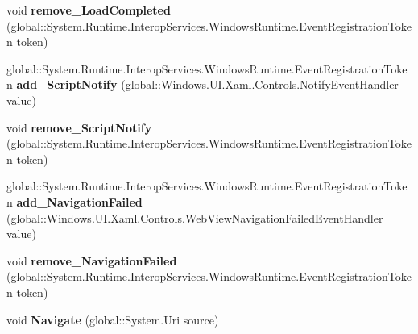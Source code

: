 \begin{DoxyCompactItemize}
\item 
\mbox{\label{interface_windows_1_1_u_i_1_1_xaml_1_1_controls_1_1_i_web_view_af38e4aa4ca0e989fc46d0f629fd7564e}} 
void {\bfseries remove\+\_\+\+Load\+Completed} (global\+::\+System.\+Runtime.\+Interop\+Services.\+Windows\+Runtime.\+Event\+Registration\+Token token)
\item 
\mbox{\label{interface_windows_1_1_u_i_1_1_xaml_1_1_controls_1_1_i_web_view_aadb8186d118d49d86ee192f2534cac58}} 
global\+::\+System.\+Runtime.\+Interop\+Services.\+Windows\+Runtime.\+Event\+Registration\+Token {\bfseries add\+\_\+\+Script\+Notify} (global\+::\+Windows.\+U\+I.\+Xaml.\+Controls.\+Notify\+Event\+Handler value)
\item 
\mbox{\label{interface_windows_1_1_u_i_1_1_xaml_1_1_controls_1_1_i_web_view_a9bb7e1887eef12d9c592c4b27677ac47}} 
void {\bfseries remove\+\_\+\+Script\+Notify} (global\+::\+System.\+Runtime.\+Interop\+Services.\+Windows\+Runtime.\+Event\+Registration\+Token token)
\item 
\mbox{\label{interface_windows_1_1_u_i_1_1_xaml_1_1_controls_1_1_i_web_view_ac5c8918c61695196369083e55461e2ae}} 
global\+::\+System.\+Runtime.\+Interop\+Services.\+Windows\+Runtime.\+Event\+Registration\+Token {\bfseries add\+\_\+\+Navigation\+Failed} (global\+::\+Windows.\+U\+I.\+Xaml.\+Controls.\+Web\+View\+Navigation\+Failed\+Event\+Handler value)
\item 
\mbox{\label{interface_windows_1_1_u_i_1_1_xaml_1_1_controls_1_1_i_web_view_a2701e74fa38f2b8566ba2ded21b4f20f}} 
void {\bfseries remove\+\_\+\+Navigation\+Failed} (global\+::\+System.\+Runtime.\+Interop\+Services.\+Windows\+Runtime.\+Event\+Registration\+Token token)
\item 
\mbox{\label{interface_windows_1_1_u_i_1_1_xaml_1_1_controls_1_1_i_web_view_ad6b51d8da7bbcb753718bf0fbdf993e9}} 
void {\bfseries Navigate} (global\+::\+System.\+Uri source)
\item 

\end{DoxyCompactItemize}
